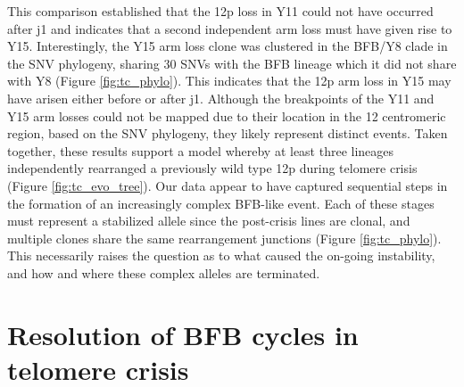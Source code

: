 \documentclass[phd,tocprelim]{cornell}
\renewcommand{\caption}[1]{\singlespacing\hangcaption{#1}\normalspacing}
\begin{document}
This comparison established that the 12p loss in Y11 could not have occurred after j1 and indicates that a second independent arm loss must have given rise to Y15. Interestingly, the Y15 arm loss clone was clustered in the BFB/Y8 clade in the SNV phylogeny, sharing 30 SNVs with the BFB lineage which it did not share with Y8 (Figure \ref{fig:tc_phylo}). This indicates that the 12p arm loss in Y15 may have arisen either before or after j1. Although the breakpoints of the Y11 and Y15 arm losses could not be mapped due to their location in the 12 centromeric region, based on the SNV phylogeny, they likely represent distinct events. Taken together, these results support a model whereby at least three lineages independently rearranged a previously wild type 12p during telomere crisis (Figure \ref{fig:tc_evo_tree}). Our data appear to have captured sequential steps in the formation of an increasingly complex BFB-like event. Each of these stages must represent a stabilized allele since the post-crisis lines are clonal, and multiple clones share the same rearrangement junctions (Figure \ref{fig:tc_phylo}). This necessarily raises the question as to what caused the on-going instability, and how and where these complex alleles are terminated.

\section{Resolution of BFB cycles in telomere crisis}


\end{document}
